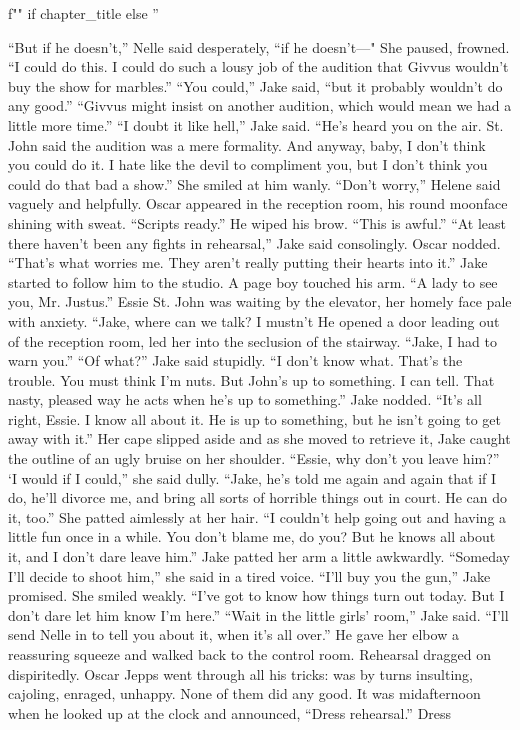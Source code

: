 \documentclass{novel}
\begin{document}
\begin{ChapterStart}
\vspace{3\nbs}
f"" if chapter_title else ''
\end{ChapterStart}

“But if he doesn’t,” Nelle said desperately, “if he doesn’t—" She paused, frowned. “I could do this. I could do such a lousy job of the audition that Givvus wouldn’t buy the show for marbles.” “You could,” Jake said, “but it probably wouldn’t do any good.” “Givvus might insist on another audition, which would mean we had a little more time.” “I doubt it like hell,” Jake said. “He’s heard you on the air. St. John said the audition was a mere formality. And anyway, baby, I don’t think you could do it. I hate like the devil to compliment you, but I don’t think you could do that bad a show.” She smiled at him wanly. “Don’t worry,” Helene said vaguely and helpfully. Oscar appeared in the reception room, his round moonface shining with sweat. “Scripts ready.” He wiped his brow. “This is awful.” “At least there haven’t been any fights in rehearsal,” Jake said consolingly. Oscar nodded. “That’s what worries me. They aren’t really putting their hearts into it.” Jake started to follow him to the studio. A page boy touched his arm. “A lady to see you, Mr. Justus.” Essie St. John was waiting by the elevator, her homely face pale with anxiety. “Jake, where can we talk? I mustn’t He opened a door leading out of the reception room, led her into the seclusion of the stairway. “Jake, I had to warn you.” “Of what?” Jake said stupidly. “I don’t know what. That’s the trouble. You must think I’m nuts. But John’s up to something. I can tell. That nasty, pleased way he acts when he’s up to something.” Jake nodded. “It’s all right, Essie. I know all about it. He is up to something, but he isn’t going to get away with it.” Her cape slipped aside and as she moved to retrieve it, Jake caught the outline of an ugly bruise on her shoulder. “Essie, why don’t you leave him?” ‘I would if I could,” she said dully. “Jake, he’s told me again and again that if I do, he’ll divorce me, and bring all sorts of horrible things out in court. He can do it, too.” She patted aimlessly at her hair. “I couldn’t help going out and having a little fun once in a while. You don’t blame me, do you? But he knows all about it, and I don’t dare leave him.” Jake patted her arm a little awkwardly. “Someday I'll decide to shoot him,” she said in a tired voice. “I’ll buy you the gun,” Jake promised. She smiled weakly. “I’ve got to know how things turn out today. But I don’t dare let him know I’m here.” “Wait in the little girls’ room,” Jake said. “I’ll send Nelle in to tell you about it, when it’s all over.” He gave her elbow a reassuring squeeze and walked back to the control room. Rehearsal dragged on dispiritedly. Oscar Jepps went through all his tricks: was by turns insulting, cajoling, enraged, unhappy. None of them did any good. It was midafternoon when he looked up at the clock and announced, “Dress rehearsal.” Dress 
\end{document}
